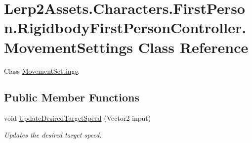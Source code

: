 \hypertarget{class_lerp2_assets_1_1_characters_1_1_first_person_1_1_rigidbody_first_person_controller_1_1_movement_settings}{}\section{Lerp2\+Assets.\+Characters.\+First\+Person.\+Rigidbody\+First\+Person\+Controller.\+Movement\+Settings Class Reference}
\label{class_lerp2_assets_1_1_characters_1_1_first_person_1_1_rigidbody_first_person_controller_1_1_movement_settings}


Class \hyperlink{class_lerp2_assets_1_1_characters_1_1_first_person_1_1_rigidbody_first_person_controller_1_1_movement_settings}{Movement\+Settings}.  


\subsection*{Public Member Functions}
\begin{DoxyCompactItemize}
\item 
void \hyperlink{class_lerp2_assets_1_1_characters_1_1_first_person_1_1_rigidbody_first_person_controller_1_1_movement_settings_a8d6db588db673e8a1c35c3d5ba6d0d9d}{Update\+Desired\+Target\+Speed} (Vector2 input)
\begin{DoxyCompactList}\small\item\em Updates the desired target speed. \end{DoxyCompactList}\end{DoxyCompactItemize}
